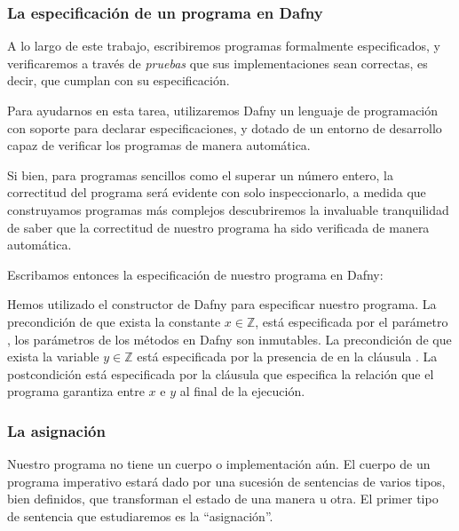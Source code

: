 \documentclass[12pt, a4paper, openany, fleqn]{book}
\begin{document}
    \subsubsection*{La especificación de un programa en Dafny}

    A lo largo de este trabajo, escribiremos programas formalmente especificados, y verificaremos a través de \textit{pruebas} que sus implementaciones sean correctas, es decir, que cumplan con su especificación.

    Para ayudarnos en esta tarea, utilizaremos Dafny un lenguaje de programación con soporte para declarar especificaciones, y dotado de un entorno de desarrollo capaz de verificar los programas de manera automática.

    Si bien, para programas sencillos como el superar un número entero, la correctitud del programa será evidente con solo inspeccionarlo, a medida que construyamos programas más complejos descubriremos la invaluable tranquilidad de saber que la correctitud de nuestro programa ha sido verificada de manera automática.

    Escribamos entonces la especificación de nuestro programa en Dafny:


    Hemos utilizado el constructor  de Dafny para especificar nuestro programa. La precondición de que exista la constante \begin{math}x \in \mathbb{Z}\end{math}, está especificada por el parámetro , los parámetros de los métodos en Dafny son inmutables. La precondición de que exista la variable \begin{math}y \in \mathbb{Z}\end{math} está especificada por la presencia de  en la cláusula .
    La postcondición está especificada por la cláusula  que especifica la relación que el programa garantiza entre $x$ e $y$ al final de la ejecución.

    \subsubsection*{La asignación}
    Nuestro programa no tiene un cuerpo o implementación aún. El cuerpo de un programa imperativo estará dado por una sucesión de sentencias de varios tipos, bien definidos, que transforman el estado de una manera u otra. El primer tipo de sentencia que estudiaremos es la ``asignación''.
\end{document}
